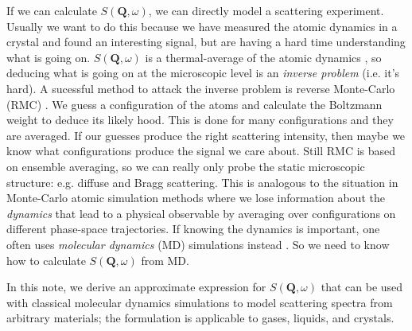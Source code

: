 \documentclass[11pt,prb,aps,nofootinbib,superscriptaddress,floatfix]{revtex4-2}
\begin{document}
If we can calculate $S(\bm{Q},\omega)$, we can directly model a scattering experiment. Usually we want to do this because we have measured the atomic dynamics in a crystal and found an interesting signal, but are having a hard time understanding what is going on. $S(\bm{Q},\omega)$ is a thermal-average of the atomic dynamics \cite{dove1993introduction}, so deducing what is going on at the microscopic level is an \emph{inverse problem} (i.e. it's hard). A sucessful method to attack the inverse problem is reverse Monte-Carlo (RMC) \cite{morganRmcdiscordReverseMonte2021}. We guess a configuration of the atoms and calculate the Boltzmann weight to deduce its likely hood. This is done for many configurations and they are averaged. If our guesses produce the right scattering intensity, then maybe we know what configurations produce the signal we care about. Still RMC is based on ensemble averaging, so we can really only probe the static microscopic structure: e.g. diffuse and Bragg scattering. This is analogous to the situation in Monte-Carlo atomic simulation methods where we lose information about the \emph{dynamics} that lead to a physical observable by averaging over configurations on different phase-space trajectories. If knowing the dynamics is important, one often uses \emph{molecular dynamics} (MD) simulations instead \cite{allen2017computer}. So we need to know how to calculate $S(\bm{Q},\omega)$ from MD.

In this note, we derive an approximate expression for $S(\bm{Q},\omega)$ that can be used with classical molecular dynamics simulations to model scattering spectra from arbitrary materials; the formulation is applicable to gases, liquids, and crystals. 
\end{document}
